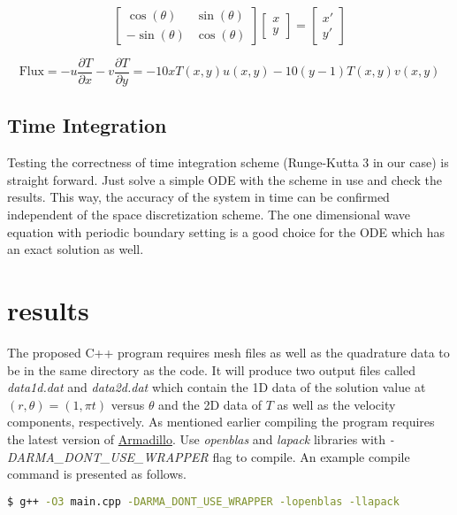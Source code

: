 \documentclass{article}
\begin{document}
\begin{equation}
\label{eq_axis_rotation_1}
\left[
\begin{matrix}
\cos(\theta) & \sin(\theta) \\
-\sin(\theta) & \cos(\theta)
\end{matrix}
\right]
\left[
\begin{matrix}
x \\
y
\end{matrix}
\right]=
\left[
\begin{matrix}
x' \\
y'
\end{matrix}
\right]
\end{equation}

\begin{equation}
\label{eq_exact_flux_1}
\text{Flux}=-u\dfrac{\partial T}{\partial x}-v\dfrac{\partial T}{\partial y}=-10 x T(x,y) u(x,y) -10 (y-1) T(x,y) v(x,y)
\end{equation}

\subsection{Time Integration}
Testing the correctness of time integration scheme (Runge-Kutta 3 in our case) is straight forward. Just solve a simple ODE with the scheme in use and check the results. This way, the accuracy of the system in time can be confirmed independent of the space discretization scheme. The one dimensional wave equation with periodic boundary setting is a good choice for the ODE which has an exact solution as well.





\section{results}
The proposed C++ program requires mesh files as well as the quadrature data to be in the same directory as the code. It will produce two output files called \textit{data1d.dat} and \textit{data2d.dat} which contain the 1D data of the solution value at $(r,\theta)=(1,\pi t)$ versus $\theta$ and the 2D data of $T$ as well as the velocity components, respectively. As mentioned earlier compiling the program requires the latest version of \href{http://arma.sourceforge.net}{Armadillo}. Use \textit{openblas} and \textit{lapack} libraries with \textit{-DARMA\_DONT\_USE\_WRAPPER} flag to compile. An example compile command is presented as follows.
\begin{lstlisting}[language=bash]
$ g++ -O3 main.cpp -DARMA_DONT_USE_WRAPPER -lopenblas -llapack
\end{lstlisting}
\end{document}
